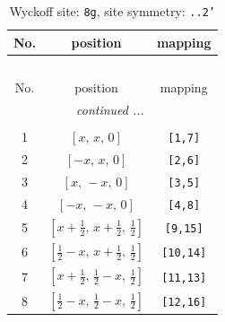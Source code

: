 \documentclass[fleqn,8pt]{jsarticle}
\begin{document}
\renewcommand{\arraystretch}{1.2}
\begin{longtable}{ccc}
\caption{Wyckoff site: {\tt 8g}, site symmetry: {\tt ..2'}}
 \\
 \hline \hline
No. & position & mapping \\ \hline \endfirsthead

\multicolumn{2}{l}{\tablename\ \thetable{}} \\
 \hline \hline
No. & position & mapping \\ \hline \endhead

 \hline \hline
\multicolumn{2}{r}{\footnotesize\it continued ...} \\ \endfoot

 \hline \hline
\multicolumn{2}{r}{} \\ \endlastfoot

1 & $\left[ x,\, x,\, 0 \right]$ & {\tt [1,7]} \\ \hline
2 & $\left[ - x,\, x,\, 0 \right]$ & {\tt [2,6]} \\ \hline
3 & $\left[ x,\, - x,\, 0 \right]$ & {\tt [3,5]} \\ \hline
4 & $\left[ - x,\, - x,\, 0 \right]$ & {\tt [4,8]} \\ \hline
5 & $\left[ x + \frac{1}{2},\, x + \frac{1}{2},\, \frac{1}{2} \right]$ & {\tt [9,15]} \\ \hline
6 & $\left[ \frac{1}{2} - x,\, x + \frac{1}{2},\, \frac{1}{2} \right]$ & {\tt [10,14]} \\ \hline
7 & $\left[ x + \frac{1}{2},\, \frac{1}{2} - x,\, \frac{1}{2} \right]$ & {\tt [11,13]} \\ \hline
8 & $\left[ \frac{1}{2} - x,\, \frac{1}{2} - x,\, \frac{1}{2} \right]$ & {\tt [12,16]} \\
\end{longtable}
\renewcommand{\arraystretch}{1.2}
\end{document}
